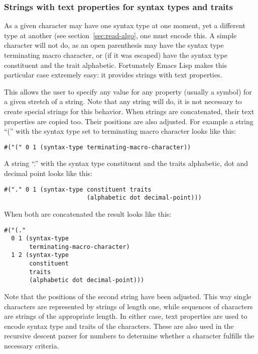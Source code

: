 \documentclass[a4paper,10pt,twoside]{report}
\newcommand{\el}{Emacs Lisp}
\begin{document}
\subsubsection{Strings with text properties for syntax types and traits}
\label{subsubsec:stings-syntax-types}

As a given character may have one syntax type at one moment, yet a different
type at another (see section~\ref{sec:read-algo}, one must encode this.  A
simple character will not do, as an open parenthesis may have the syntax type
terminating macro character, or (if it was escaped) have the syntax type
constituent and the trait alphabetic.  Fortunately \el{} makes this particular
case extremely easy: it provides strings with text properties.\cite[Section
2.3.8.4 ``Text Properties in Strings'']{elisp-reference}

This allows the user to specify any value for any property (usually a symbol)
for a given stretch of a string.  Note that any string will do, it is not
necessary to create special strings for this behavior.  When strings are
concatenated, their text properties are copied too.  Their positions are also
adjusted.  For example a string ``('' with the syntax type set to terminating
macro character looks like this:

\begin{lstlisting}[style=lispinline]
#("(" 0 1 (syntax-type terminating-macro-character))
\end{lstlisting}

A string ``.'' with the syntax type constituent and the traits alphabetic, dot
and decimal point looks like this:

\begin{lstlisting}[style=lispinline]
#("." 0 1 (syntax-type constituent traits 
                       (alphabetic dot decimal-point)))
\end{lstlisting}

When both are concatenated the result looks like this:

\begin{lstlisting}[style=lispinline]
#("(."
  0 1 (syntax-type
       terminating-macro-character)
  1 2 (syntax-type
       constituent
       traits
       (alphabetic dot decimal-point)))
\end{lstlisting}

Note that the positions of the second string have been adjusted.  This way
single characters are represented by strings of length one, while sequences of
characters are strings of the appropriate length.  In either case, text
properties are used to encode syntax type and traits of the characters.  These
are also used in the recursive descent parser for numbers to determine whether a
character fulfills the necessary criteria.
\end{document}
